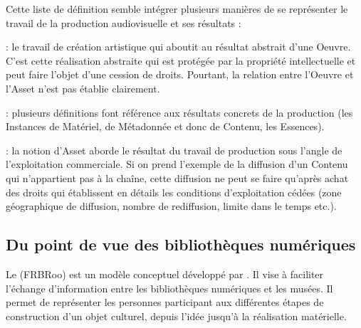 Cette liste de définition semble intégrer plusieurs manières de se représenter le travail de la production audiovisuelle et ses résultats :
\begin{liste} 

	\item[\g{artistique}] : le travail de création artistique qui aboutit au résultat abstrait d'une Oeuvre. 
	C'est cette réalisation abstraite qui est protégée par la propriété intellectuelle et peut faire l'objet d'une cession de droits.
	Pourtant, la relation entre l'Oeuvre et l'Asset n'est pas établie clairement.

	\item[\g{concrète}] : plusieurs définitions font référence aux résultats concrets de la production (les Instances de Matériel, de Métadonnée et donc de Contenu, les Essences).

	\item[\g{commerciale}] : la notion d'Asset aborde le résultat du travail de production sous l'angle de l'exploitation commerciale. 
	Si on prend l'exemple de la diffusion d'un Contenu qui n'appartient pas à la chaîne, cette diffusion ne peut se faire qu'après achat des droits qui établissent en détails les conditions d'exploitation cédées (zone géographique de diffusion, nombre de rediffusion, limite dans le temps etc.).
	
\end{liste}



\subsection{Du point de vue des bibliothèques numériques}\label{sec:pv-bn}
Le  (FRBRoo) est un modèle conceptuel développé par \cite{Aalberg2008}.
Il vise à faciliter l’échange d’information entre les bibliothèques numériques et les musées. 
Il permet de représenter les personnes participant aux différentes étapes de construction d’un objet culturel, depuis l’idée jusqu’à la réalisation matérielle.


